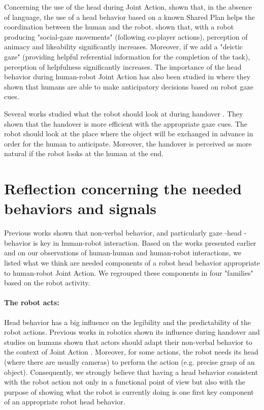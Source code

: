 \documentclass[english,a4paper,11pt,twoside]{StyleThese}
\begin{document}
Concerning the use of the head during Joint Action, \cite{lallee2013cooperative} shown that, in the absence of language, the use of a head behavior based on a known Shared Plan helps the coordination between the human and the robot. \cite{zaga2017simple} shown that, with a robot producing "social-gaze movements" (following co-player actions), perception of animacy and likeability significantly increases. Moreover, if we add a "deictic gaze" (providing helpful referential information for the completion of the task), perception of helpfulness significantly increases. The importance of the head behavior during human-robot Joint Action has also been studied in \cite{boucher2012reach} where they shown that humans are able to make anticipatory decisions based on robot gaze cues. 

Several works studied what the robot should look at during handover \cite{moon2014meet, gharbi2015toward}. They shown that the handover is more efficient with the appropriate gaze cues. The robot should look at the place where the object will be exchanged in advance in order for the human to anticipate. Moreover, the handover is perceived as more natural if the robot looks at the human at the end.


\section{Reflection concerning the needed behaviors and signals}

\label{sec:reflection}

Previous works shown that non-verbal behavior, and particularly gaze -head - behavior is key in human-robot interaction. Based on the works presented earlier and on our observations of human-human and human-robot interactions, we listed what we think are needed components of a robot head behavior appropriate to human-robot Joint Action. We regrouped these components in four "families" based on the robot activity.

\paragraph{The robot acts:}
Head behavior has a big influence on the legibility and the predictability of the robot actions. Previous works in robotics shown its influence during handover \cite{moon2014meet, gharbi2015toward} and studies on humans shown that actors should adapt their non-verbal behavior to the context of Joint Action \cite{becchio2010toward, vesper2010minimal}. Moreover, for some actions, the robot needs its head (where there are usually cameras) to perform the action (e.g. precise grasp of an object). Consequently, we strongly believe that having a head behavior consistent with the robot action not only in a functional point of view but also with the purpose of showing what the robot is currently doing is one first key component of an appropriate robot head behavior.
\end{document}
